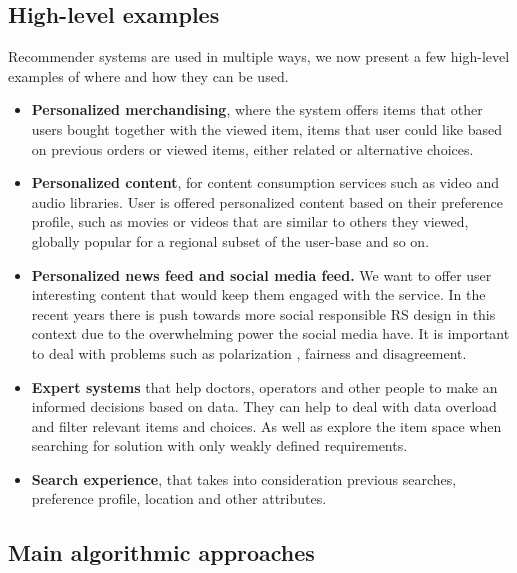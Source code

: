 \subsection{High-level examples}\label{subsec:01_rec_sys.high_level_examples}
Recommender systems are used in multiple ways, we now present a few high-level examples of where and how they can be used.
\begin{itemize}
    \item \textbf{Personalized merchandising}, where the system offers items that other users bought together with the viewed item, items that user could like based on previous orders or viewed items, either related or alternative choices.
    \item \textbf{Personalized content}, for content consumption services such as video and audio libraries. User is offered personalized content based on their preference profile, such as movies or videos that are similar to others they viewed, globally popular for a regional subset of the user-base and so on.
    \item \textbf{Personalized news feed and social media feed.} We want to offer user interesting content that would keep them engaged with the service. In the recent years there is push towards more social responsible RS design in this context due to the overwhelming power the social media have. It is important to deal with problems such as polarization \cite{recommender_systems_fighting_polarization}, fairness and disagreement.
    \item \textbf{Expert systems} that help doctors, operators and other people to make an informed decisions based on data. They can help to deal with data overload and filter relevant items and choices. As well as explore the item space when searching for solution with only weakly defined requirements.
    \item \textbf{Search experience}, that takes into consideration previous searches, preference profile, location and other attributes.
\end{itemize}


\subsection{Main algorithmic approaches}\label{subsec:01_rec_sys.main_alg_approaches}

